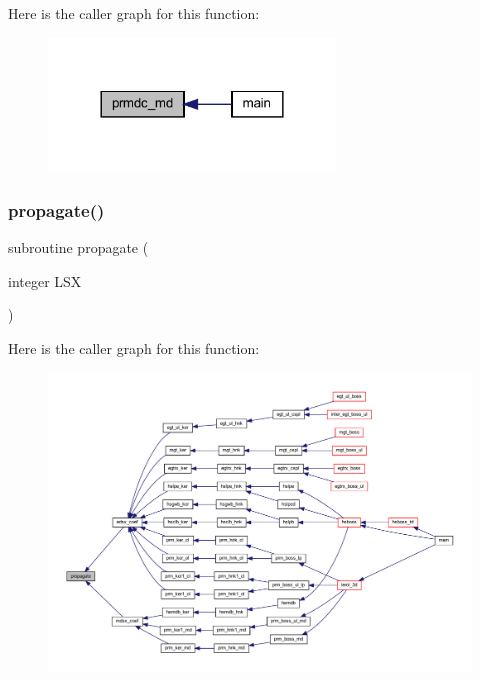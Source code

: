 Here is the caller graph for this function\+:\nopagebreak
\begin{figure}[H]
\begin{center}
\leavevmode
\includegraphics[width=216pt]{Leroi_8f90_a2212318f6dd3a1fda873532ddfb09348_icgraph}
\end{center}
\end{figure}
\mbox{\label{Leroi_8f90_a58ae4aba68186ebcf3cfb74fa1361584}} 
\subsubsection{\texorpdfstring{propagate()}{propagate()}}
{\footnotesize\ttfamily subroutine propagate (\begin{DoxyParamCaption}\item[{integer}]{L\+SX }\end{DoxyParamCaption})}

Here is the caller graph for this function\+:\nopagebreak
\begin{figure}[H]
\begin{center}
\leavevmode
\includegraphics[width=350pt]{Leroi_8f90_a58ae4aba68186ebcf3cfb74fa1361584_icgraph}
\end{center}
\end{figure}
\mbox{\label{Leroi_8f90_a3849611a53bff318a7443ebea8b8b480}} 
